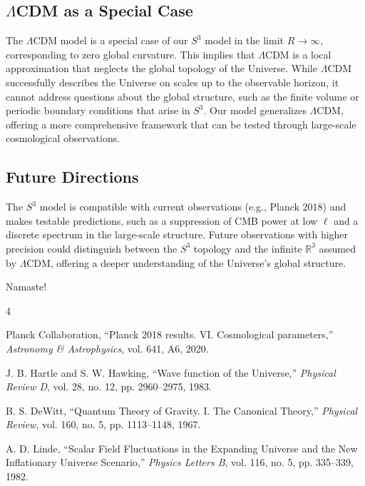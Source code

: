\documentclass[12pt]{article}
\begin{document}
\subsection{\(\Lambda\)CDM as a Special Case}

The \(\Lambda\)CDM model is a special case of our \(S^3\) model in the limit \(R \to \infty\), corresponding to zero global curvature. This implies that \(\Lambda\)CDM is a local approximation that neglects the global topology of the Universe. While \(\Lambda\)CDM successfully describes the Universe on scales up to the observable horizon, it cannot address questions about the global structure, such as the finite volume or periodic boundary conditions that arise in \(S^3\). Our model generalizes \(\Lambda\)CDM, offering a more comprehensive framework that can be tested through large-scale cosmological observations.

\subsection{Future Directions}

The \(S^3\) model is compatible with current observations (e.g., Planck 2018) and makes testable predictions, such as a suppression of CMB power at low \(\ell\) and a discrete spectrum in the large-scale structure. Future observations with higher precision could distinguish between the \(S^3\) topology and the infinite \(\mathbb{R}^3\) assumed by \(\Lambda\)CDM, offering a deeper understanding of the Universe's global structure.

Namaste!

\begin{thebibliography}{4}

Planck Collaboration, ``Planck 2018 results. VI. Cosmological parameters,'' \textit{Astronomy \& Astrophysics}, vol. 641, A6, 2020.

J. B. Hartle and S. W. Hawking, ``Wave function of the Universe,'' \textit{Physical Review D}, vol. 28, no. 12, pp. 2960--2975, 1983.

B. S. DeWitt, ``Quantum Theory of Gravity. I. The Canonical Theory,'' \textit{Physical Review}, vol. 160, no. 5, pp. 1113--1148, 1967.

A. D. Linde, ``Scalar Field Fluctuations in the Expanding Universe and the New Inflationary Universe Scenario,'' \textit{Physics Letters B}, vol. 116, no. 5, pp. 335--339, 1982.

\end{thebibliography}
\end{document}
